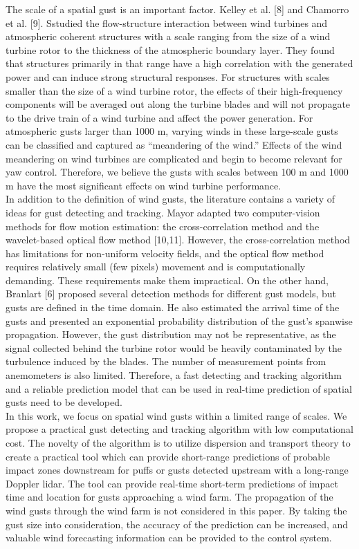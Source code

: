 The scale of a spatial gust is an important factor. Kelley et al. [8] and Chamorro et al. [9]. Sstudied the flow-structure interaction between wind turbines and atmospheric coherent structures with a scale ranging from the size of a wind turbine rotor to the thickness of the atmospheric boundary layer. They found that structures primarily in that range have a high correlation with the generated power and can induce strong structural responses. For structures with scales smaller than the size of a wind turbine rotor, the effects of their high-frequency components will be averaged out along the turbine blades and will not propagate to the drive train of a wind turbine and affect the power generation. For atmospheric gusts larger than 1000 m, varying winds in these large-scale gusts can be classified and captured as “meandering of the wind.” Effects of the wind meandering on wind turbines are complicated and begin to become relevant for yaw control. Therefore, we believe the gusts with scales between 100 m and 1000 m have the most significant effects on wind turbine performance.\\
In addition to the definition of wind gusts, the literature contains a variety of ideas for gust detecting and tracking. Mayor adapted two computer-vision methods for flow motion estimation: the cross-correlation method and the wavelet-based optical flow method [10,11]. However, the cross-correlation method has limitations for non-uniform velocity fields, and the optical flow method requires relatively small (few pixels) movement and is computationally demanding. These requirements make them impractical. On the other hand, Branlart [6] proposed several detection methods for different gust models, but gusts are defined in the time domain. He also estimated the arrival time of the gusts and presented an exponential probability distribution of the gust’s spanwise propagation. However, the gust distribution may not be representative, as the signal collected behind the turbine rotor would be heavily contaminated by the turbulence induced by the blades. The number of measurement points from anemometers is also limited. Therefore, a fast detecting and tracking algorithm and a reliable prediction model that can be used in real-time prediction of spatial gusts need to be developed.\\
In this work, we focus on spatial wind gusts within a limited range of scales. We propose a practical gust detecting and tracking algorithm with low computational cost. The novelty of the algorithm is to utilize dispersion and transport theory to create a practical tool which can provide short-range predictions of probable impact zones downstream for puffs or gusts detected upstream with a long-range Doppler lidar. The tool can provide real-time short-term predictions of impact time and location for gusts approaching a wind farm. The propagation of the wind gusts through the wind farm is not considered in this paper. By taking the gust size into consideration, the accuracy of the prediction can be increased, and valuable wind forecasting information can be provided to the control system.



